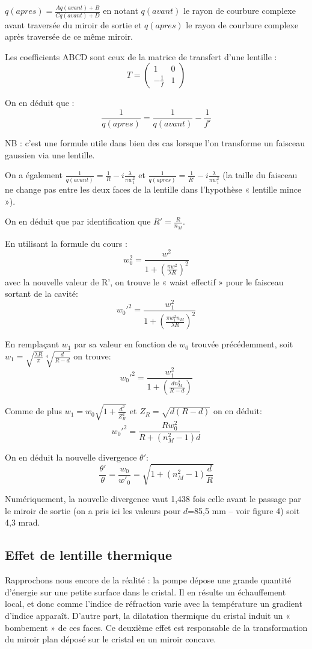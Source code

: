 \documentclass{book}
\begin{document}
\(q(apres)=\frac{Aq(avant)+B}{Cq(avant)+D}\) en notant \(q(avant)\) le rayon de courbure complexe avant traversée du miroir de sortie et \(q(apres)\) le rayon de
courbure complexe après traversée de ce même miroir.

Les coefficients ABCD sont ceux de la matrice de transfert d'une lentille :
\[T= \begin{pmatrix}
1 & 0 \\
-\frac 1f & 1
\end{pmatrix}\]

On en déduit que :
\[\frac 1{q(apres)}=\frac 1{q(avant)}-\frac 1{f'}\]

NB : c'est une formule utile dans bien des cas lorsque l'on transforme un faisceau gaussien via une lentille.

On a également \(\frac 1{q(avant)}=\frac 1R-i\frac \lambda{\pi w_1^2}\) et \(\frac 1{q(apres)}=\frac 1{R'}-i\frac \lambda{\pi w_1^2}\) (la taille du faisceau ne change pas entre les deux faces de la lentille dans l'hypothèse « lentille mince »).

On en déduit que par identification que \(R'=\frac R{n_M}\).

En utilisant la formule du cours :
\[w_0^2 = \frac {w^2}{1+\left(\frac{\pi w^2}{\lambda R}\right)^2}\]
avec la nouvelle valeur de R', on trouve le « waist effectif » pour le faisceau sortant de la cavité:
\[w_0'^2 = \frac {w_1^2}{1+\left(\frac{\pi w_1^2n_M}{\lambda R}\right)^2}\]

En remplaçant \(w_1\) par sa valeur en fonction de \(w_0\) trouvée précédemment, soit \(w_1=\sqrt{\frac{\lambda R}{\pi}}\sqrt[4]{\frac d{R-d}}\) on trouve:
\[w_0'^2 = \frac {w_1^2}{1+\left(\frac{dn_M^2}{R-d}\right)}\]

Comme de plus \(w_1=w_0\sqrt{1+\frac {d^2}{Z_R^2}}\) et \(Z_R=\sqrt{d(R-d)}\) on en déduit:
\[w_0'^2=\frac {R w_0^2}{R+(n_M^2-1)d}\]

On en déduit la nouvelle divergence \(\theta '\):
\[\frac {\theta '}\theta = \frac{w_0}{w'_0}=\sqrt{1+(n_M^2-1)\frac dR}\]

Numériquement, la nouvelle divergence vaut 1,438 fois celle avant le passage par le miroir de sortie (on a pris ici les valeurs pour \(d\)=85,5 mm – voir figure 4) soit 4,3 mrad.

\subsection{Effet de lentille thermique}

Rapprochons nous encore de la réalité : la pompe dépose une grande quantité d'énergie sur une petite surface dans le cristal. Il en résulte un échauffement local, et donc comme l'indice de réfraction varie avec la température un gradient d'indice apparaît. D'autre part, la dilatation thermique du cristal induit un « bombement » de ces faces. Ce deuxième effet est responsable de la transformation du miroir plan déposé sur le cristal en un miroir concave.
\end{document}
